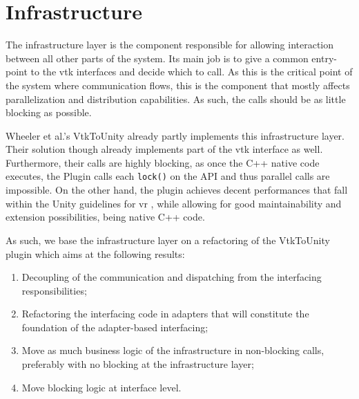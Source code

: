 \section{Infrastructure}
\label{sec:design-infrastructure}

The infrastructure layer is the component responsible for allowing interaction between all other parts of the system. Its main job is to give a common entry-point to the \acrshort{vtk} interfaces and decide which to call. As this is the critical point of the system where communication flows, this is the component that mostly affects parallelization and distribution capabilities. As such, the calls should be as little blocking as possible.

Wheeler et al.'s VtkToUnity \cite{wheeler_virtual_2018} already partly implements this infrastructure layer. Their solution though already implements part of the \acrshort{vtk} interface as well. Furthermore, their calls are highly blocking, as once the C++ native code executes, the Plugin calls each \verb|lock()| on the API and thus parallel calls are impossible. On the other hand, the plugin achieves decent performances that fall within the Unity guidelines for \acrshort{vr} \cite{noauthor_vr_nodate-1}, while allowing for good maintainability and extension possibilities, being native C++ code.

As such, we base the infrastructure layer on a refactoring of the VtkToUnity plugin which aims at the following results:

\begin{enumerate}
    \item Decoupling of the communication and dispatching from the interfacing responsibilities;
    \item Refactoring the interfacing code in adapters that will constitute the foundation of the adapter-based interfacing;
    \item Move as much business logic of the infrastructure in non-blocking calls, preferably with no blocking at the infrastructure layer;
    \item Move blocking logic at interface level.
\end{enumerate}


